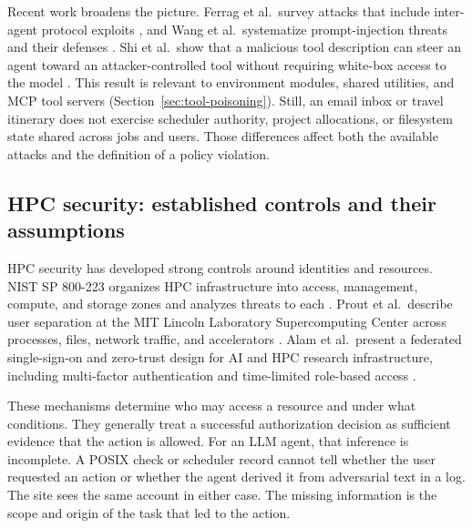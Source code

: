 Recent work broadens the picture. Ferrag et al.\ survey attacks that include inter-agent protocol exploits \cite{Ferrag2025ProtocolExploits}, and Wang et al.\ systematize prompt-injection threats and their defenses \cite{Wang2026PILandscape}. Shi et al.\ show that a malicious tool description can steer an agent toward an attacker-controlled tool without requiring white-box access to the model \cite{Shi2025ToolHijacker}. This result is relevant to environment modules, shared utilities, and MCP tool servers (Section~\ref{sec:tool-poisoning}). Still, an email inbox or travel itinerary does not exercise scheduler authority, project allocations, or filesystem state shared across jobs and users. Those differences affect both the available attacks and the definition of a policy violation.

\subsection{HPC security: established controls and their assumptions}
\label{sec:background-hpcsec}

HPC security has developed strong controls around identities and resources. NIST SP 800-223 organizes HPC infrastructure into access, management, compute, and storage zones and analyzes threats to each \cite{NIST2024SP800223}. Prout et al.\ describe user separation at the MIT Lincoln Laboratory Supercomputing Center across processes, files, network traffic, and accelerators \cite{Prout2024UserSeparation}. Alam et al.\ present a federated single-sign-on and zero-trust design for AI and HPC research infrastructure, including multi-factor authentication and time-limited role-based access \cite{Alam2024ZeroTrust}.

These mechanisms determine who may access a resource and under what conditions. They generally treat a successful authorization decision as sufficient evidence that the action is allowed. For an LLM agent, that inference is incomplete. A POSIX check or scheduler record cannot tell whether the user requested an action or whether the agent derived it from adversarial text in a log. The site sees the same account in either case. The missing information is the scope and origin of the task that led to the action.

